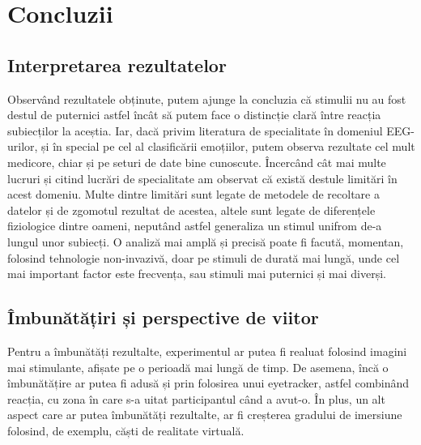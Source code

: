 \chapter{Concluzii}

\section{Interpretarea rezultatelor}

Observând rezultatele obținute, putem ajunge la concluzia că stimulii nu au fost destul de puternici astfel încât să putem face o distincție clară între reacția subiecților la aceștia. Iar, dacă privim literatura de specialitate în domeniul EEG-urilor, și în special pe cel al clasificării emoțiilor, putem observa rezultate cel mult medicore\cite{recreation_attempt}, chiar și pe seturi de date bine cunoscute. Încercând cât mai multe lucruri și citind lucrări de specialitate am observat că există destule limitări în acest domeniu. Multe dintre limitări sunt legate de metodele de recoltare a datelor și de zgomotul rezultat de acestea, altele sunt legate de diferențele fiziologice dintre oameni, neputând astfel generaliza un stimul unifrom de-a lungul unor subiecți. O analiză mai amplă și precisă poate fi facută, momentan, folosind tehnologie non-invazivă, doar pe stimuli de durată mai lungă, unde cel mai important factor este frecvența, sau stimuli mai puternici și mai diverși. 

\section{Îmbunătățiri și perspective de viitor}

Pentru a îmbunătăți rezultalte, experimentul ar putea fi realuat folosind imagini mai stimulante, afișate pe o perioadă mai lungă de timp. De asemena, încă o îmbunătățire ar putea fi adusă și prin folosirea unui eyetracker, astfel combinând reacția, cu zona în care s-a uitat participantul când a avut-o. În plus, un alt aspect care ar putea îmbunătăți rezultalte, ar fi creșterea gradului de imersiune folosind, de exemplu, căști de realitate virtuală.